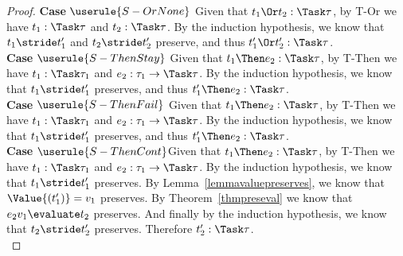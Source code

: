 \begin{proof}
  \noindent\textbf{Case} $\userule{S-OrNone}$ Given that $t_1\Or t_2:\Task\tau$,
  by T-Or we have $t_1:\Task\tau$ and $t_2:\Task\tau$. By the induction hypothesis,
  we know that $t_1\stride t_1'$ and $t_2\stride t_2'$ preserve, and thus
  $t_1'\Or t_2':\Task\tau$.\\

  \noindent\textbf{Case} $\userule{S-ThenStay}$ Given that $t_1\Then e_2:\Task\tau$,
  by T-Then we have $t_1:\Task\tau_1$ and $e_2:\tau_1\to\Task\tau$. By the induction
  hypothesis, we know that $t_1\stride t_1'$ preserves, and thus $t_1'\Then e_2:\Task\tau$.\\

  \noindent\textbf{Case} $\userule{S-ThenFail}$ Given that $t_1\Then e_2:\Task\tau$,
  by T-Then we have $t_1:\Task\tau_1$ and $e_2:\tau_1\to\Task\tau$. By the induction
  hypothesis, we know that $t_1\stride t_1'$ preserves, and thus $t_1'\Then e_2:\Task\tau$.\\

  \noindent\textbf{Case} $\userule{S-ThenCont}$Given that $t_1\Then e_2:\Task\tau$,
  by T-Then we have $t_1:\Task\tau_1$ and $e_2:\tau_1\to\Task\tau$. By the induction
  hypothesis, we know that $t_1\stride t_1'$ preserves. By
  Lemma~\ref{lemmavaluepreserves}, we know that $\Value{(t_1')}=v_1$ preserves.
  By Theorem~\ref{thmpreseval} we know that $e_2 v_1\evaluate t_2$ preserves. And
  finally by the induction hypothesis, we know that $t_2\stride t_2'$ preserves.
  Therefore $t_2':\Task\tau$.\\

\end{proof}


